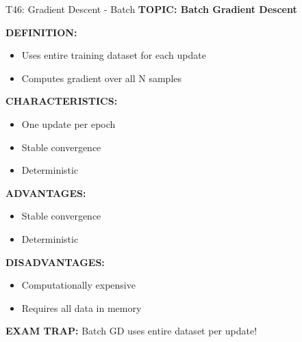 \documentclass[8pt]{beamer}
\begin{document}
	\begin{frame}{T46: Gradient Descent - Batch}
		\fontsize{6.5}{7.5}\selectfont
		\textbf{TOPIC: Batch Gradient Descent}
		
		\vspace{0.1cm}
		\textbf{DEFINITION:}
		\begin{itemize}
			\item Uses entire training dataset for each update
			\item Computes gradient over all N samples
		\end{itemize}
		
		\vspace{0.1cm}
		\textbf{CHARACTERISTICS:}
		\begin{itemize}
			\item One update per epoch
			\item Stable convergence
			\item Deterministic
		\end{itemize}
		
		\vspace{0.1cm}
		\textbf{ADVANTAGES:}
		\begin{itemize}
			\item Stable convergence
			\item Deterministic
		\end{itemize}
		
		\vspace{0.1cm}
		\textbf{DISADVANTAGES:}
		\begin{itemize}
			\item Computationally expensive
			\item Requires all data in memory
		\end{itemize}
		
		\textcolor{myred}{\textbf{EXAM TRAP:}} Batch GD uses \textcolor{myblue}{entire dataset} per update!
	\end{frame}
	
\end{document}
